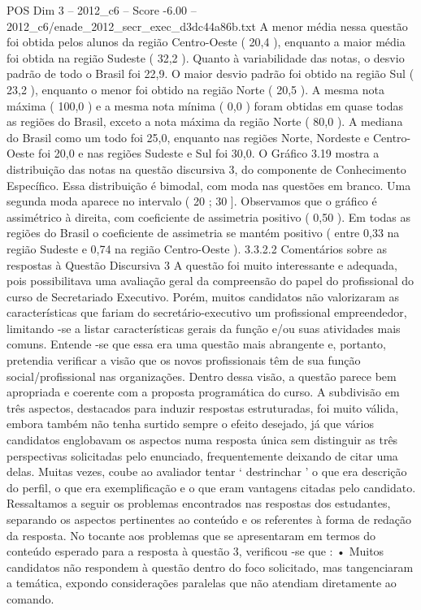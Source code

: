 \begin{textsample}{POS Dim 3 – 2012\_c6 – Score -6.00 – 2012\_c6/enade\_2012\_secr\_exec\_d3dc44a86b.txt}
A menor média nessa questão foi obtida pelos alunos da região Centro-Oeste ( 20,4 ), enquanto a maior média foi obtida na região Sudeste ( 32,2 ).
Quanto à variabilidade das notas, o desvio padrão de todo o Brasil foi 22,9.
O maior desvio padrão foi obtido na região Sul ( 23,2 ), enquanto o menor foi obtido na região Norte ( 20,5 ).
A mesma nota máxima ( 100,0 ) e a mesma nota mínima ( 0,0 ) foram obtidas em quase todas as regiões do Brasil, exceto a nota máxima da região Norte ( 80,0 ).
A mediana do Brasil como um todo foi 25,0, enquanto nas regiões Norte, Nordeste e Centro-Oeste foi 20,0 e nas regiões Sudeste e Sul foi 30,0.
O Gráfico 3.19 mostra a distribuição das notas na questão discursiva 3, do componente de Conhecimento Específico.
Essa distribuição é bimodal, com moda nas questões em branco.
Uma segunda moda aparece no intervalo ( 20 ; 30 ].
Observamos que o gráfico é assimétrico à direita, com coeficiente de assimetria positivo ( 0,50 ).
Em todas as regiões do Brasil o coeficiente de assimetria se mantém positivo ( entre 0,33 na região Sudeste e 0,74 na região Centro-Oeste ). 3.3.2.2 Comentários sobre as respostas à Questão Discursiva 3 A questão foi muito interessante e adequada, pois possibilitava uma avaliação geral da compreensão do papel do profissional do curso de Secretariado Executivo.
Porém, muitos candidatos não valorizaram as características que fariam do secretário-executivo um profissional empreendedor, limitando -se a listar características gerais da função e/ou suas atividades mais comuns.
Entende -se que essa era uma questão mais abrangente e, portanto, pretendia verificar a visão que os novos profissionais têm de sua função social/profissional nas organizações.
Dentro dessa visão, a questão parece bem apropriada e coerente com a proposta programática do curso.
A subdivisão em três aspectos, destacados para induzir respostas estruturadas, foi muito válida, embora também não tenha surtido sempre o efeito desejado, já que vários candidatos englobavam os aspectos numa resposta única sem distinguir as três perspectivas solicitadas pelo enunciado, frequentemente deixando de citar uma delas.
Muitas vezes, coube ao avaliador tentar ‘ destrinchar ’ o que era descrição do perfil, o que era exemplificação e o que eram vantagens citadas pelo candidato.
Ressaltamos a seguir os problemas encontrados nas respostas dos estudantes, separando os aspectos pertinentes ao conteúdo e os referentes à forma de redação da resposta.
No tocante aos problemas que se apresentaram em termos do conteúdo esperado para a resposta à questão 3, verificou -se que : • Muitos candidatos não respondem à questão dentro do foco solicitado, mas tangenciaram a temática, expondo considerações paralelas que não atendiam diretamente ao comando.

\end{textsample}
